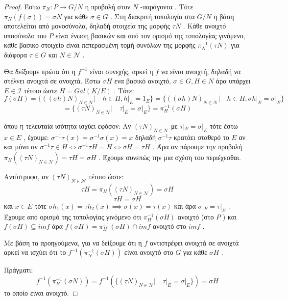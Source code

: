\documentclass[oneside,a4paper]{article}
\begin{document}
\begin{proof}
Έστω $\pi_N : P \rightarrow G/N$ η προβολή στον $N$ -παράγοντα . Τότε $\pi_N (f(\sigma)) = \sigma N$ για κάθε $\sigma \in G$ . Στη διακριτή τοπολογία στα $G/N$ η βάση αποτελείται από μονοσύνολα, δηλαδή στοιχεία της μορφής $\tau N$ . Κάθε ανοιχτό υποσύνολο του $P$ είναι ένωση βασικών και από τον ορισμό της τοπολογίας γινόμενο, κάθε βασικό στοιχείο είναι πεπερασμένη τομή συνόλων της μορφής $\pi^{-1}_N (\tau N)$ για διάφορα $\tau \in G$ και $N \in \mathcal{N}$ . 









Θα δείξουμε πρώτα ότι η $f^{-1}$ είναι συνεχής, αρκεί η $f$ να είναι ανοιχτή, δηλαδή να στέλνει ανοιχτά σε ανοιχτά. Έστω $\sigma H$ ενα βασικό ανοιχτό, $\sigma \in G , H \in N$ άρα υπάρχει $E \in \mathcal{I}$ τέτοιο ώστε $H = Gal(K/E)$ . Τότε:
$$f(\sigma H) = \{\left(\left(\sigma h \right)N\right)_{N \in \mathcal{N}}| \quad h \in H, h|_E = 1_E\} = \{\left(\left(\sigma h \right)N\right)_{N \in \mathcal{N}}| \quad h \in H, \sigma h|_E = \sigma|_E\}$$
$$= \{\left( \tau N\right)_{N \in \mathcal{N}}| \quad \tau|_E = \sigma|_E\} = \pi^{-1}_H (\sigma H)$$

όπου η τελευταία ισότητα ισχύει εφόσον:
Αν $(\tau N)_{N \in \mathcal{N}}$ με $\tau |_E = \sigma |_E$ τότε έστω $x \in E$ , έχουμε: $\sigma^{-1} \tau (x) = \sigma^{-1} \sigma (x) = x$ δηλαδή $\sigma^{-1} \tau$ κρατάει σταθερό το $E$ αν και μόνο αν $\sigma^{-1} \tau \in H \iff \sigma^{-1} \tau H = H \iff \sigma H = \tau H$ . Άρα αν πάρουμε την προβολή $\pi_H \left( \left(\tau N \right)_{N \in \mathcal{N}}\right) = \tau H = \sigma H$ . Έχουμε συνεπώς την μια σχέση του περιέχεσθαι.

Αντίστροφα, αν $(\tau N)_{N \in \mathcal{N}}$ τέτοιο ώστε:
$$\tau H = \pi_H \left( \left(\tau N \right)_{N \in \mathcal{N}}\right) = \sigma H$$
$$\tau H = \sigma H$$
και $x \in E$ τότε $\sigma h_1 (x) = \tau h_2 (x) \implies \sigma (x) = \tau (x)$ και άρα $\sigma|_E = \tau|_E$ .
Έχουμε από ορισμό της τοπολογίας γινόμενο ότι $\pi^{-1}_H (\sigma H)$ ανοιχτό (στο $P$ ) και $f(\sigma H) \subseteq imf$ άρα $f(\sigma H) = \pi^{-1}_H (\sigma H) \cap imf$ ανοιχτό στο $imf$ .

Με βάση τα προηγούμενα, για να δείξουμε ότι η $f$ αντιστρέφει ανοιχτά σε ανοιχτά αρκεί να ισχύει ότι το $f^{-1} (\pi^{-1}_N (\sigma H))$ είναι ανοιχτό στο $G$ για κάθε $\sigma H$ . 

Πράγματι:
$$f^{-1} (\pi^{-1}_H (\sigma N)) = f^{-1} (\{(\tau N)_{N \in \mathcal{N}} | \quad \tau|_E = \sigma|_E \}) = \sigma H$$
το οποίο είναι ανοιχτό.


\end{proof}
\end{document}
